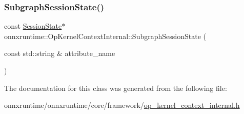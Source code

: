 \mbox{\label{classonnxruntime_1_1OpKernelContextInternal_ae6c150d6d6d27669b65f556b45be25ce}} 
\subsubsection{\texorpdfstring{Subgraph\+Session\+State()}{SubgraphSessionState()}}
{\footnotesize\ttfamily const \mbox{\hyperlink{classonnxruntime_1_1SessionState}{Session\+State}}$\ast$ onnxruntime\+::\+Op\+Kernel\+Context\+Internal\+::\+Subgraph\+Session\+State (\begin{DoxyParamCaption}\item[{const std\+::string \&}]{attribute\+\_\+name }\end{DoxyParamCaption})\hspace{0.3cm}{\ttfamily [inline]}}



The documentation for this class was generated from the following file\+:\begin{DoxyCompactItemize}
\item 
onnxruntime/onnxruntime/core/framework/\mbox{\hyperlink{op__kernel__context__internal_8h}{op\+\_\+kernel\+\_\+context\+\_\+internal.\+h}}\end{DoxyCompactItemize}
